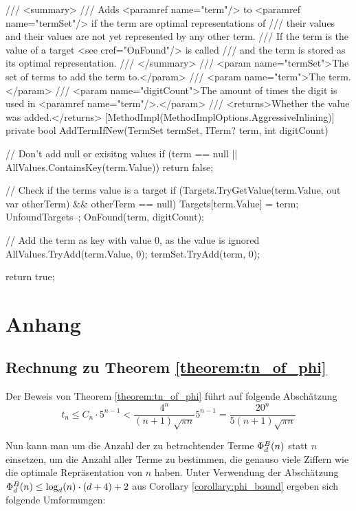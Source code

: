 \documentclass{article}
\theoremstyle{nonumberplain}
\begin{document}
\begin{lstcs}[]
{    /// <summary>
    /// Adds <paramref name="term"/> to <paramref name="termSet"/> if the term are optimal representations of
    /// their values and their values are not yet represented by any other term.
    /// If the term is the value of a target <see cref="OnFound"/> is called
    /// and the term is stored as its optimal representation.
    /// </summary>
    /// <param name="termSet">The set of terms to add the term to.</param>
    /// <param name="term">The term.</param>
    /// <param name="digitCount">The amount of times the digit is used in <paramref name="term"/>.</param>
    /// <returns>Whether the value was added.</returns>
    [MethodImpl(MethodImplOptions.AggressiveInlining)]
    private bool AddTermIfNew(TermSet termSet, ITerm? term, int digitCount)
    {
        // Don't add null or exisitng values
        if (term == null || AllValues.ContainsKey(term.Value))
        {
            return false;
        }

        // Check if the terms value is a target
        if (Targets.TryGetValue(term.Value, out var otherTerm) && otherTerm == null)
        {
            Targets[term.Value] = term;
            UnfoundTargets--;
            OnFound(term, digitCount);
        }

        // Add the term as key with value 0, as the value is ignored
        AllValues.TryAdd(term.Value, 0);
        termSet.TryAdd(term, 0);

        return true;
    }
}
\end{lstcs}

\section{Anhang}

\subsection{Rechnung zu Theorem \ref{theorem:tn_of_phi}}

Der Beweis von Theorem \ref{theorem:tn_of_phi} führt auf folgende Abschätzung
    \[t_n \leq C_n \cdot 5^{n-1} < \frac{4^n}{(n+1)\sqrt{\pi n}} 5^{n-1} =  \frac{20^n}{5(n+1)\sqrt{\pi n}}\]

Nun kann man um die Anzahl der zu betrachtender Terme \(\Phi_{d}^{B}(n)\) statt \(n\) einsetzen, um die Anzahl aller Terme zu bestimmen, die genauso viele Ziffern wie die optimale Repräsentation von \(n\) haben.
Unter Verwendung der Abschätzung \(\Phi_{d}^{B}(n) \leq \log_d(n) \cdot (d+4) + 2\) aus Corollary \ref{corollary:phi_bound} ergeben sich folgende Umformungen:
\end{document}
